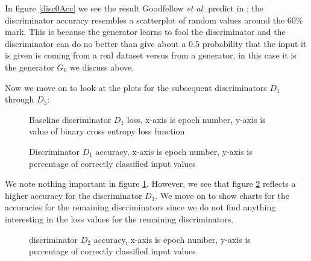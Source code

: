 \documentclass[conference]{IEEEtran}
\begin{document}
In figure \ref{disc0Acc} we see the result Goodfellow \textit{et al.} predict in
\cite{gan}; the discriminator accuracy resembles a scatterplot of random values
around the 60\% mark.  This is because the generator learns to fool the
discriminator and the discriminator can do no better than give about a 0.5
probability that the input it is given is coming from a real dataset versus from
a generator, in this case it is the generator $G_{0}$ we discuss above.

Now we move on to look at the plots for
the subsequent discriminators $D_{1}$ through $D_{5}$:

\begin{figure}[htpb]
\caption{Baseline discriminator $D_{1}$ loss, x-axis is epoch number, y-axis is 
value of binary cross entropy loss function }
\label{disc1Loss}
\end{figure}

\begin{figure}[htpb]
\caption{Discriminator $D_{1}$ accuracy, x-axis is epoch number, y-axis is 
percentage of correctly classified input values }
\label{disc1Acc}
\end{figure}

We note nothing important in figure \ref{disc1Loss}. However, we see that figure
\ref{disc1Acc} reflects a higher accuracy for the discriminator $D_{1}$.  We
move on to show charts for the accuracies  for the remaining discriminators
since we do not find anything interesting in the loss values for the remaining
discriminators.

\begin{figure}[htpb]
\caption{discriminator $D_{2}$ accuracy, x-axis is epoch number, y-axis is 
percentage of correctly classified input values }
\label{disc2Acc}
\end{figure}
\end{document}
